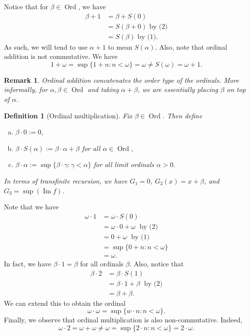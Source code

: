 \documentclass[10pt]{article}
\DeclareMathOperator{\im}{Im}
\DeclareMathOperator{\Ord}{Ord}
\theoremstyle{newstyle}
\newtheorem{remark}[thm]{Remark}
\newtheorem{defn}[thm]{Definition}
\begin{document}
Notice that for $\beta \in \Ord$, we have 
\begin{align*} 
\beta + 1 &= \beta + S(0) \\ 
&= S(\beta + 0) \text{ by (2)} \\
&= S(\beta) \text{ by (1).}
\end{align*}
As such, we will tend to use $\alpha + 1$ to mean $S(\alpha)$. Also, note that ordinal addition 
is not commutative. We have 
\[ 1 + \omega = \sup\{1+n : n < \omega\} = \omega \neq S(\omega) = \omega + 1. \]

\begin{remark} 
Ordinal addition concatenates the order type of the ordinals. More informally, for 
$\alpha, \beta \in \Ord$ and taking $\alpha + \beta$, we are essentially placing $\beta$ 
on top of $\alpha$.
\end{remark}

\begin{defn}[Ordinal multiplication] 
Fix $\beta \in \Ord$. Then define 
\begin{enumerate}[(a)]
    \item $\beta \cdot 0 := 0$, 
    \item $\beta \cdot S(\alpha) := \beta \cdot \alpha + \beta$ for all $\alpha \in \Ord$, 
    \item $\beta \cdot \alpha := \sup\{\beta \cdot \gamma : \gamma < \alpha\}$ for all 
    limit ordinals $\alpha > 0$.
\end{enumerate} 
In terms of transfinite recursion, we have $G_1 = 0$, $G_2(x) = x+\beta$, and $G_3 = \sup(\im f)$.
\end{defn}

Note that we have 
\begin{align*} 
\omega \cdot 1 &= \omega \cdot S(0) \\ 
&= \omega \cdot 0 + \omega \; \text{ by (2)} \\
&= 0 + \omega \; \text{ by (1)} \\
&= \sup\{0 + n : n < \omega\} \\
&= \omega. 
\end{align*}
In fact, we have $\beta \cdot 1 = \beta$ for all ordinals $\beta$. Also, notice that 
\begin{align*} 
\beta \cdot 2 &= \beta \cdot S(1) \\
&= \beta \cdot 1 + \beta \; \text{ by (2)} \\ 
&= \beta + \beta. 
\end{align*}
We can extend this to obtain the ordinal
\[ \omega \cdot \omega = \sup\{w \cdot n : n < \omega\}. \]
Finally, we observe that ordinal multiplication is also non-commutative. Indeed, 
\[ \omega \cdot 2 = \omega + \omega \neq \omega = \sup\{2 \cdot n : n < \omega\} = 2 \cdot \omega. \]
\end{document}
